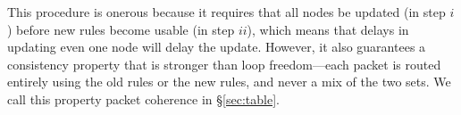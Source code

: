 

This procedure is onerous because it requires that all nodes be updated (in step $i$) before new rules become usable (in step $ii$), which means that delays in updating even one node will delay the update. However, it also guarantees a consistency property that is stronger than loop freedom---each packet is routed entirely using the old rules or the new rules, and never a mix of the two sets. We call this property packet coherence in \S\ref{sec:table}.

